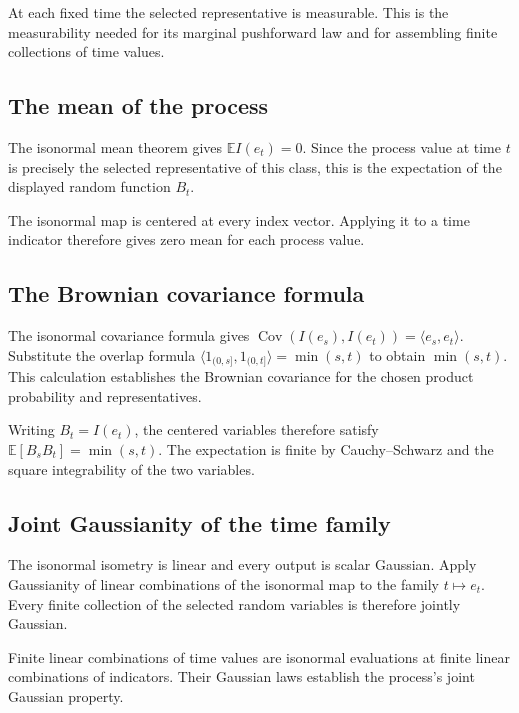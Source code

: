 \documentclass[11pt,a4paper]{article}
\begin{document}
At each fixed time the selected representative is measurable. This is the measurability needed for its marginal pushforward law and for assembling finite collections of time values.


\subsection{\texorpdfstring{The mean of the process}{The mean of the process}}


The isonormal mean theorem gives \(\mathbb EI(e_t)=0\). Since the process value at time \(t\) is precisely the selected representative of this class, this is the expectation of the displayed random function \(B_t\).



The isonormal map is centered at every index vector. Applying it to a time indicator therefore gives zero mean for each process value.


\subsection{\texorpdfstring{The Brownian covariance formula}{The Brownian covariance formula}}


The isonormal covariance formula gives \(\operatorname{Cov}(I(e_s),I(e_t))=\langle e_s,e_t\rangle\). Substitute the overlap formula \(\langle1_{(0,s]},1_{(0,t]}\rangle=\min(s,t)\) to obtain \(\min(s,t)\). This calculation establishes the Brownian covariance for the chosen product probability and representatives.



Writing \(B_t=I(e_t)\), the centered variables therefore satisfy \(\mathbb E[B_sB_t]=\min(s,t)\). The expectation is finite by Cauchy–Schwarz and the square integrability of the two variables.


\subsection{\texorpdfstring{Joint Gaussianity of the time family}{Joint Gaussianity of the time family}}


The isonormal isometry is linear and every output is scalar Gaussian. Apply Gaussianity of linear combinations of the isonormal map to the family \(t\mapsto e_t\). Every finite collection of the selected random variables is therefore jointly Gaussian.



Finite linear combinations of time values are isonormal evaluations at finite linear combinations of indicators. Their Gaussian laws establish the process's joint Gaussian property.
\end{document}
